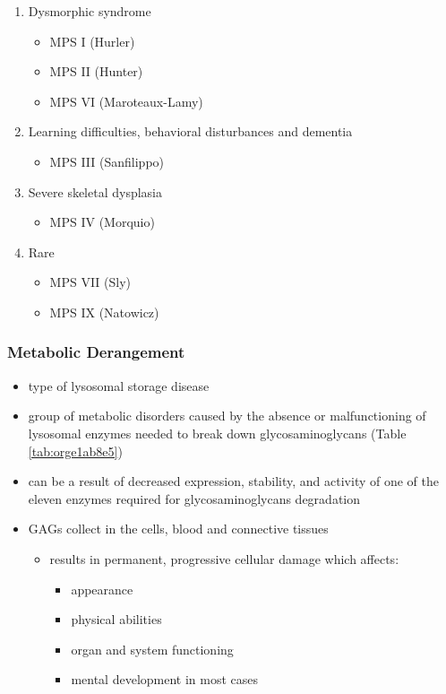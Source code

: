 \documentclass[12pt]{scrartcl}
\begin{document}
\begin{enumerate}
\item Dysmorphic syndrome
\label{sec:orgdd0d11e}
\begin{itemize}
\item MPS I (Hurler)
\item MPS II (Hunter)
\item MPS VI (Maroteaux-Lamy)
\end{itemize}
\item Learning difficulties, behavioral disturbances and dementia
\label{sec:org5b2c75d}
\begin{itemize}
\item MPS III (Sanfilippo)
\end{itemize}
\item Severe skeletal dysplasia
\label{sec:org0852162}
\begin{itemize}
\item MPS IV (Morquio)
\end{itemize}
\item Rare
\label{sec:org72af80b}
\begin{itemize}
\item MPS VII (Sly)
\item MPS IX (Natowicz)
\end{itemize}
\end{enumerate}

\subsubsection{Metabolic Derangement}
\label{sec:orgc94a46d}
\begin{itemize}
\item type of lysosomal storage disease
\item group of metabolic disorders caused by the absence or malfunctioning
of lysosomal enzymes needed to break down glycosaminoglycans (Table \ref{tab:orge1ab8e5})
\item can be a result of decreased expression, stability, and activity of
one of the eleven enzymes required for glycosaminoglycans
degradation
\item GAGs collect in the cells, blood and connective tissues
\begin{itemize}
\item results in permanent, progressive cellular damage which affects:
\begin{itemize}
\item appearance
\item physical abilities
\item organ and system functioning
\item mental development in most cases
\end{itemize}
\end{itemize}
\end{itemize}
\end{document}
